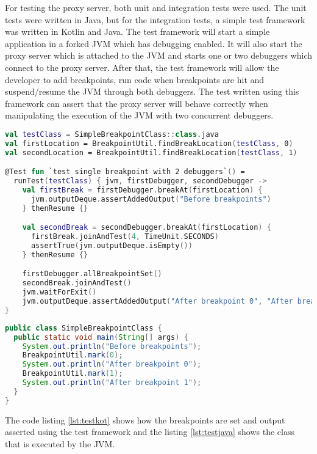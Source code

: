 \documentclass[..thesis.tex]{subfiles}
\begin{document}
For testing the proxy server, both unit and integration tests were used.
The unit tests were written in Java, but for the integration tests, a simple test framework was written in Kotlin and Java.
The test framework will start a simple application in a forked JVM which has debugging enabled.
It will also start the proxy server which is attached to the JVM and starts one or two debuggers which connect to the proxy server.
After that, the test framework will allow the developer to add breakpoints, run code when breakpoints are hit and suspend/resume the JVM through both debuggers.
The test written using this framework can assert that the proxy server will behave correctly when manipulating the execution of the JVM with two concurrent debuggers.

\begin{lstlisting}[language=Kotlin, caption={\textit{Example of an integration test adding breakpoints and asserting JVM output.}}, captionpos=b, label={lst:testkot}]
val testClass = SimpleBreakpointClass::class.java
val firstLocation = BreakpointUtil.findBreakLocation(testClass, 0)
val secondLocation = BreakpointUtil.findBreakLocation(testClass, 1)

@Test fun `test single breakpoint with 2 debuggers`() = 
  runTest(testClass) { jvm, firstDebugger, secondDebugger ->
    val firstBreak = firstDebugger.breakAt(firstLocation) {
      jvm.outputDeque.assertAddedOutput("Before breakpoints")
    } thenResume {}

    val secondBreak = secondDebugger.breakAt(firstLocation) {
      firstBreak.joinAndTest(4, TimeUnit.SECONDS)
      assertTrue(jvm.outputDeque.isEmpty())
    } thenResume {}

    firstDebugger.allBreakpointSet()
    secondBreak.joinAndTest()
    jvm.waitForExit()
    jvm.outputDeque.assertAddedOutput("After breakpoint 0", "After breakpoint 1")
}
\end{lstlisting}

\begin{lstlisting}[language=Java, caption={\textit{Test class being executed on the forked JVM.}}, captionpos=b, label={lst:testjava}]
public class SimpleBreakpointClass {
  public static void main(String[] args) {
    System.out.println("Before breakpoints");
    BreakpointUtil.mark(0);
    System.out.println("After breakpoint 0");
    BreakpointUtil.mark(1);
    System.out.println("After breakpoint 1");
  }
}
\end{lstlisting}

The code listing \ref{lst:testkot} shows how the breakpoints are set and output asserted using the test framework and the listing \ref{lst:testjava} shows the class that is executed by the JVM.
\end{document}
